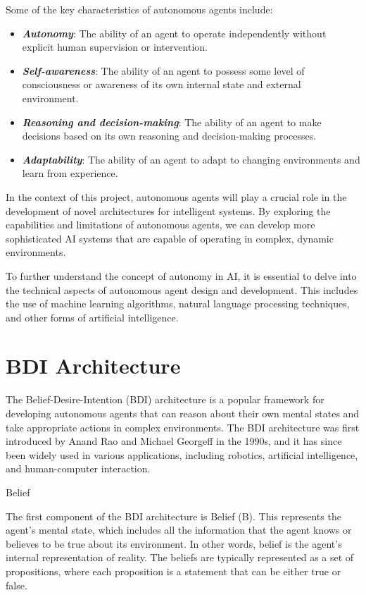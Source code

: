 Some of the key characteristics of autonomous agents include:

\begin{itemize}
  \item \textit{\textbf{Autonomy}}: The ability of an agent to operate independently
    without explicit human supervision or intervention.

  \item \textit{\textbf{Self-awareness}}: The ability of an agent to possess some
    level of consciousness or awareness of its own internal state and external environment.

  \item \textit{\textbf{Reasoning and decision-making}}: The ability of an agent
    to make decisions based on its own reasoning and decision-making processes.

  \item \textit{\textbf{Adaptability}}: The ability of an agent to adapt to changing
    environments and learn from experience.
\end{itemize}

In the context of this project, autonomous agents will play a crucial role in
the development of novel architectures for intelligent systems. By exploring the
capabilities and limitations of autonomous agents, we can develop more
sophisticated AI systems that are capable of operating in complex, dynamic environments.

To further understand the concept of autonomy in AI, it is essential to delve
into the technical aspects of autonomous agent design and development. This includes
the use of machine learning algorithms, natural language processing techniques, and
other forms of artificial intelligence.

\section{BDI Architecture}
The Belief-Desire-Intention (BDI) architecture is a popular framework for developing
autonomous agents that can reason about their own mental states and take appropriate
actions in complex environments. The BDI architecture was first introduced by
Anand Rao and Michael Georgeff in the 1990s, and it has since been widely used in
various applications, including robotics, artificial intelligence, and human-computer
interaction.

Belief

The first component of the BDI architecture is Belief (B). This represents the
agent's mental state, which includes all the information that the agent knows or
believes to be true about its environment. In other words, belief is the agent's
internal representation of reality. The beliefs are typically represented as a
set of propositions, where each proposition is a statement that can be either true
or false.

